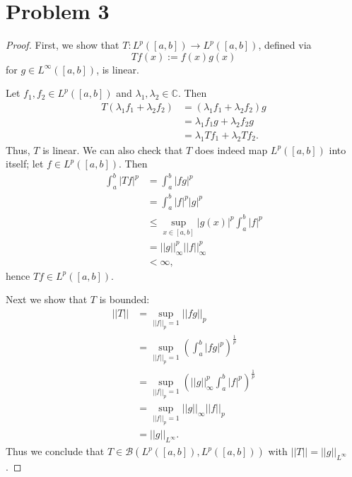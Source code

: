 \documentclass{article}
\newcommand{\C}{\mathbb{C}} %
\begin{document}
\section*{Problem 3}
\begin{proof}
	First, we show that $T: L^{p}([a, b]) \to L^{p}([a, b])$, defined via
	\begin{equation}
		Tf(x) := f(x)g(x)
	\end{equation}
	for $g \in L^{\infty}([a, b])$, is linear.
	
	Let $f_1, f_2 \in L^{p}([a, b])$ and $\lambda_1, \lambda_2 \in \C$. Then
	\begin{align}
		T(\lambda_1 f_1 + \lambda_2 f_2) &= (\lambda_1 f_1 + \lambda_2 f_2)g\\
		&= \lambda_1 f_1 g + \lambda_2 f_2 g \\
		&= \lambda_1 Tf_1 + \lambda_2 Tf_2.
	\end{align}
	Thus, $T$ is linear. We can also check that $T$ does indeed map $L^p([a, b])$ into itself; let $f \in L^{p}([a, b])$. Then
	\begin{align}
		\int_a ^b |Tf|^p &= \int_a ^b |fg|^p \\
		&= \int_a ^b |f|^p |g|^p \\
		&\leq \sup_{x \in [a, b]}|g(x)|^p \int_a ^b |f|^p \\
		&= ||g||_{\infty}^p ||f||_{\infty}^p \\
		&< \infty,
	\end{align}
	hence $Tf \in L^p ([a, b])$. 
	
	Next we show that $T$ is bounded:
	\begin{align}
		||T|| &= \sup_{||f||_p = 1}||fg||_p \\
		&= \sup_{||f||_p=1}\left(\int_a ^b |fg|^p\right)^\frac{1}{p} \\
		&= \sup_{||f||_p = 1} \left(||g||_{\infty}^p \int_a ^b |f|^p\right)^\frac{1}{p} \\
		&= \sup_{||f||_p = 1} ||g||_{\infty} ||f||_p \\
		&= ||g||_{L^{\infty}}.
	\end{align}
	Thus we conclude that $T \in \mathcal{B}(L^p([a, b]), L^p([a, b]))$ with $||T|| = ||g||_{L^{\infty}}$.
\end{proof}
\end{document}
